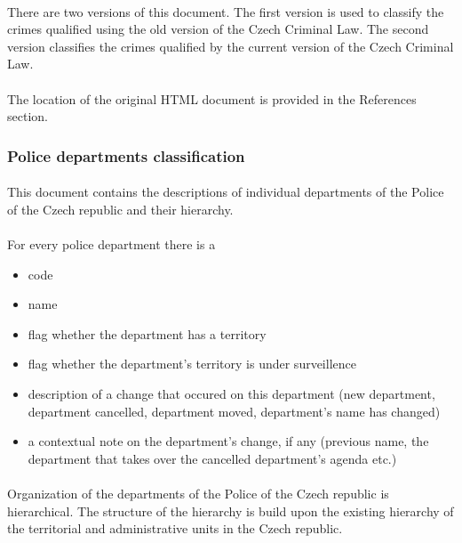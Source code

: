 \paragraph{}
There are two versions of this document.
The first version is used to classify the crimes qualified using the old version of the Czech Criminal Law.
The second version classifies the crimes qualified by the current version of the Czech Criminal Law.

\paragraph{} The location of the original HTML document is provided in the References section.

\subsubsection{Police departments classification}\label{sec:departments}
\paragraph{}
This document contains the descriptions of individual departments of the Police of the Czech republic and their hierarchy.
\paragraph{}
For every police department there is a
\begin{itemize}
	\item code
	\item name
	\item flag whether the department has a territory
	\item flag whether the department's territory is under surveillence
	\item description of a change that occured on this department (new department, department cancelled, department moved, department's name has changed)
	\item a contextual note on the department's change, if any (previous name, the department that takes over the cancelled department's agenda etc.)
\end{itemize}

\paragraph{}
Organization of the departments of the Police of the Czech republic is hierarchical.
The structure of the hierarchy is build upon the existing hierarchy of the territorial and administrative units in the Czech republic.

